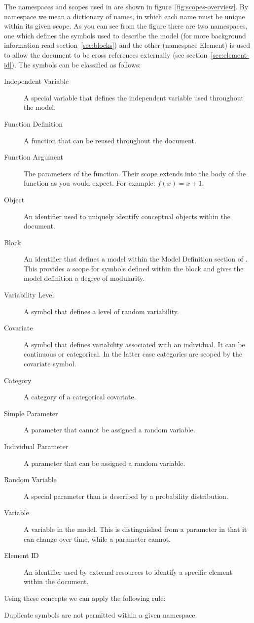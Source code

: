 The namespaces and scopes used in \pharmml are shown in
figure~\ref{fig:scopes-overview}. By namespace we mean a
dictionary of names, in which each name must be unique within its
given scope. As you can see from the figure there are
two namespaces, one which defines the symbols used to describe the
model (for more background information read section~\ref{sec:blocks})
and the other (namespace Element) is used to allow the \pharmml
document to be cross references externally (see
section~\ref{sec:element-id}).  The symbols can be classified as
follows:
\begin{description}
\item[Independent Variable] A special variable that defines the
  independent variable used throughout the model.
\item[Function Definition] A function that can be reused throughout
  the \pharmml document.
\item[Function Argument] The parameters of the function. Their scope
  extends into the body of the function as you would expect. For
  example: $f(x) = x + 1$.
\item[Object] An identifier used to uniquely identify conceptual
  objects within the \pharmml document.
\item[Block] An identifier that defines a model within the Model
  Definition section of \pharmml. This provides a scope for symbols
  defined within the block and gives the model definition a degree of
  modularity.
\item[Variability Level] A symbol that defines a level of random
  variability.
\item[Covariate] A symbol that defines variability associated with an
  individual. It can be continuous or categorical. In the latter case
  categories are scoped by the covariate symbol.
\item[Category] A category of a categorical covariate.
\item[Simple Parameter] A parameter that cannot be assigned a random variable.
\item[Individual Parameter] A parameter that can be assigned a random
  variable.
\item[Random Variable] A special parameter than is described by a
  probability distribution.
\item[Variable] A variable in the model. This is distinguished from a
  parameter in that it can change over time, while a parameter cannot.
\item[Element ID] An identifier used by external resources to identify
  a specific element within the \pharmml document.
\end{description}
%
Using these concepts we can apply the following rule:
%
\begin{valrules}
   Duplicate
  symbols are not permitted within a given namespace.
\end{valrules}

